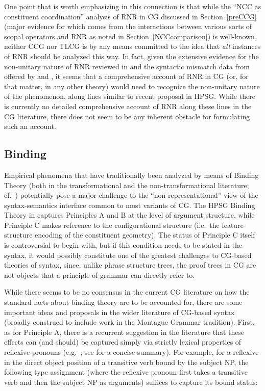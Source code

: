 \documentclass[output=paper
                ,modfonts
 	        ,biblatex
                ,babelshorthands
                ,newtxmath
                ,draftmode
                ,colorlinks, citecolor=brown
]{langscibook}
\begin{document}
One point that is worth emphasizing in this connection is that
while the ``NCC as constituent coordination'' analysis of RNR in CG
discussed in Section~\ref{preCCG} (major evidence for which comes from the
interactions between various sorts of scopal operators and RNR as
noted in Section~\ref{NCCcomparison}) is well-known, neither CCG nor TLCG is by
any means committed to the idea that \emph{all} instances of RNR should be
analyzed this way.
In fact, given the extensive evidence for the non-unitary nature of
RNR reviewed in \citet{Chaves2014a-u} and the syntactic mismatch data from
 offered by \citet{ACS2016a-u} and \citet{SAHM2019a-u}, it seems
that a comprehensive account of RNR in CG (or, for that matter, in any
other theory) would need to recognize the
non-unitary nature of the phenomenon, along lines similar to
 recent proposal in HPSG. While there is currently no
detailed comprehensive account of RNR along these lines in the
CG literature, there does not  seem to be any inherent 
obstacle for formulating such an account.


\subsection{Binding}

Empirical phenomena that have traditionally been analyzed by means of
Binding Theory (both in the transformational and the
non-transformational literature; cf.~)
potentially pose a major challenge to the
``non-representational'' view of the syntax-semantics interface common
to most variants of CG. The HPSG Binding Theory in \citet{PS92a,ps2}
captures Principles A and B at the level of argument structure, while
Principle C makes reference to the configurational structure (i.e.\
the feature-structure encoding of the constituent geometry). The
status of Principle C itself is controversial to begin with, but if
this condition needs to be stated in the syntax, it would possibly
constitute one of the greatest challenges to CG-based theories of
syntax, since, unlike phrase structure trees, the proof trees in CG
are not objects that a principle of grammar can directly refer to.

While there seems to be no consensus in the current CG literature on
how the standard
facts about binding theory are to be accounted for, there are
some important ideas and proposals in the wider literature of CG-based
syntax (broadly construed to include work in the Montague Grammar
tradition). First, as for Principle A, there is a recurrent suggestion
in the literature that these effects can (and should) be captured
simply via strictly lexical properties of reflexive pronouns
(e.g.\ \citealt{keenan88binding,szabolcsi1992}; see \citealt[43--44]{buringbinding} for a concise summary).
For example, for a reflexive in the direct object position
of a transitive verb bound by the subject NP,
the following type assignment (where the reflexive pronoun first takes
a transitive verb and then the subject NP as arguments) suffices to
capture its bound status:
\end{document}

